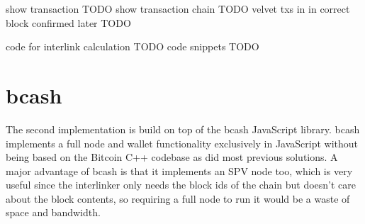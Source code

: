 show transaction TODO
show transaction chain TODO
velvet txs in in correct block confirmed later TODO

code for interlink calculation TODO
code snippets TODO

\section{bcash}
The second implementation is build on top of the bcash JavaScript library. bcash implements a full node and wallet functionality exclusively in JavaScript without being based on the Bitcoin C++ codebase as did most previous solutions. A major advantage of bcash is that it implements an SPV node too, which is very useful since the interlinker only needs the block ids of the chain but doesn't care about the block contents, so requiring a full node to run it would be a waste of space and bandwidth.
